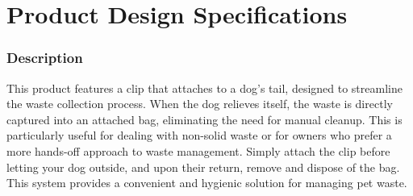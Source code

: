 \documentclass[12pt]{article}
\theoremstyle{definition} %
\theoremstyle{plain} %
\begin{document}
\pagebreak
\section{Product Design Specifications}

\subsubsection*{Description}

This product features a clip that attaches to a dog's tail, designed to streamline the
waste collection process. When the dog relieves itself, the waste is directly captured
into an attached bag, eliminating the need for manual cleanup. This is particularly
useful for dealing with non-solid waste or for owners who prefer a more hands-off
approach to waste management. Simply attach the clip before letting your dog
outside, and upon their return, remove and dispose of the bag. This system provides
a convenient and hygienic solution for managing pet waste.
\end{document}
